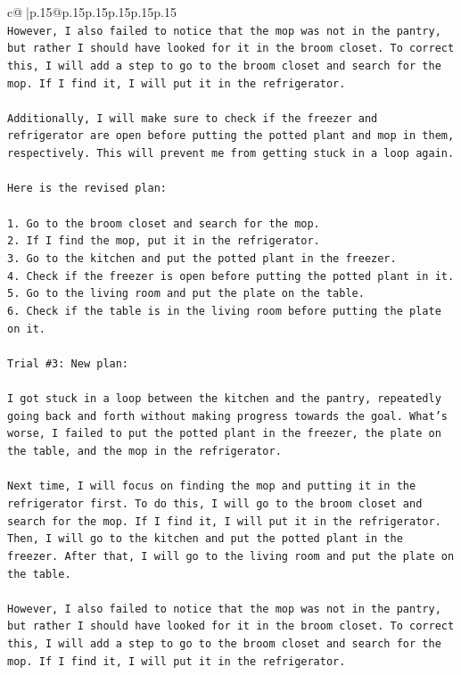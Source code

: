 \documentclass{article}
\begin{document}
{\begin{supertabular}{c@{$\;$}|p{.15\linewidth}@{}p{.15\linewidth}p{.15\linewidth}p{.15\linewidth}p{.15\linewidth}p{.15\linewidth}}
{{{\\ 
\texttt{However, I also failed to notice that the mop was not in the pantry, but rather I should have looked for it in the broom closet. To correct this, I will add a step to go to the broom closet and search for the mop. If I find it, I will put it in the refrigerator. } \\
\\ 
\texttt{Additionally, I will make sure to check if the freezer and refrigerator are open before putting the potted plant and mop in them, respectively. This will prevent me from getting stuck in a loop again. } \\
\\ 
\texttt{Here is the revised plan:} \\
\\ 
\texttt{1. Go to the broom closet and search for the mop.} \\
\texttt{2. If I find the mop, put it in the refrigerator.} \\
\texttt{3. Go to the kitchen and put the potted plant in the freezer.} \\
\texttt{4. Check if the freezer is open before putting the potted plant in it.} \\
\texttt{5. Go to the living room and put the plate on the table.} \\
\texttt{6. Check if the table is in the living room before putting the plate on it.} \\
\\ 
\texttt{Trial \#3: New plan: } \\
\\ 
\texttt{I got stuck in a loop between the kitchen and the pantry, repeatedly going back and forth without making progress towards the goal. What's worse, I failed to put the potted plant in the freezer, the plate on the table, and the mop in the refrigerator. } \\
\\ 
\texttt{Next time, I will focus on finding the mop and putting it in the refrigerator first. To do this, I will go to the broom closet and search for the mop. If I find it, I will put it in the refrigerator. Then, I will go to the kitchen and put the potted plant in the freezer. After that, I will go to the living room and put the plate on the table.} \\
\\ 
\texttt{However, I also failed to notice that the mop was not in the pantry, but rather I should have looked for it in the broom closet. To correct this, I will add a step to go to the broom closet and search for the mop. If I find it, I will put it in the refrigerator.} \\
}}}
\end{supertabular}}
\end{document}
